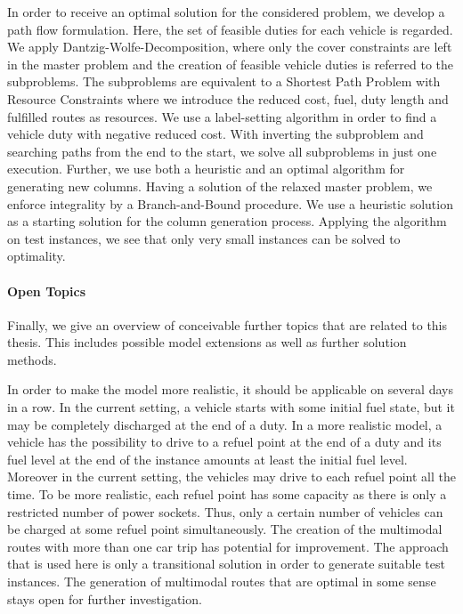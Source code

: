 In order to receive an optimal solution for the considered problem, we develop a path flow formulation. Here, the set of feasible duties for each vehicle is regarded. We apply Dantzig-Wolfe-Decomposition, where only the cover constraints are left in the master problem and the creation of feasible vehicle duties is referred to the subproblems. The subproblems are equivalent to a Shortest Path Problem with Resource Constraints where we introduce the reduced cost, fuel, duty length and fulfilled routes as resources. We use a label-setting algorithm in order to find a vehicle duty with negative reduced cost. With inverting the subproblem and searching paths from the end to the start, we solve all subproblems in just one execution. Further, we use both a heuristic and an optimal algorithm for generating new columns. Having a solution of the relaxed master problem, we enforce integrality by a Branch-and-Bound procedure. We use a heuristic solution as a starting solution for the column generation process. Applying the algorithm on test instances, we see that only very small instances can be solved to optimality.

\paragraph{Open Topics} \parfill

Finally, we give an overview of conceivable further topics that are related to this thesis. This includes possible model extensions as well as further solution methods. 

In order to make the model more realistic, it should be applicable on several days in a row. In the current setting, a vehicle starts with some initial fuel state, but it may be completely discharged at the end of a duty. In a more realistic model, a vehicle has the possibility to drive to a refuel point at the end of a duty and its fuel level at the end of the instance amounts at least the initial fuel level. Moreover in the current setting, the vehicles may drive to each refuel point all the time. To be more realistic, each refuel point has some capacity as there is only a restricted number of power sockets. Thus, only a certain number of vehicles can be charged at some refuel point simultaneously. The creation of the multimodal routes with more than one car trip has potential for improvement. The approach that is used here is only a transitional solution in order to generate suitable test instances. The generation of multimodal routes that are optimal in some sense stays open for further investigation.

